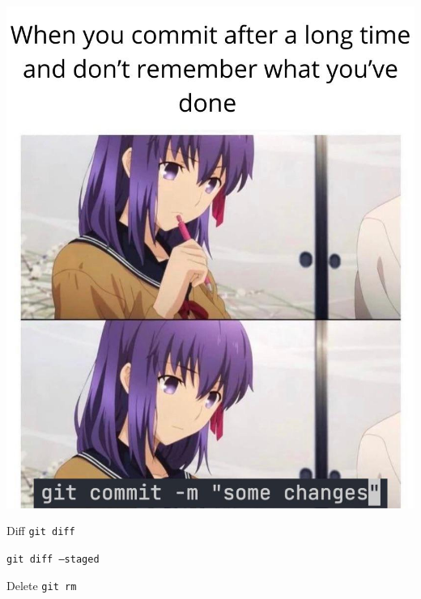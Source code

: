 \documentclass[17pt]{beamer}
\begin{document}
\begin{frame}
  \centering
  \includegraphics[height=\textheight]{commit-meme}
\end{frame}

\begin{frame}{Diff}
  \texttt{git diff}

  \texttt{git diff --staged}
\end{frame}

\begin{frame}{Delete}
  \texttt{git rm}
\end{frame}
\end{document}
